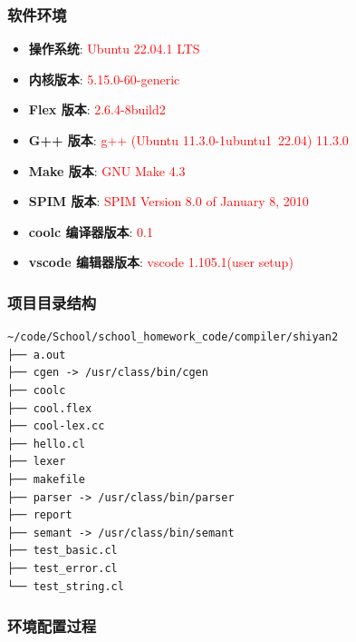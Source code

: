\documentclass[twocolumn]{article}
\begin{document}
\subsubsection{软件环境}
\begin{itemize}
    \item \textbf{操作系统}: \textcolor{red}{Ubuntu 22.04.1 LTS}
    \item \textbf{内核版本}: \textcolor{red}{5.15.0-60-generic}
    \item \textbf{Flex 版本}: \textcolor{red}{2.6.4-8build2}
    \item \textbf{G++ 版本}: \textcolor{red}{g++ (Ubuntu 11.3.0-1ubuntu1~22.04) 11.3.0}
    \item \textbf{Make 版本}: \textcolor{red}{GNU Make 4.3}
    \item \textbf{SPIM 版本}: \textcolor{red}{SPIM Version 8.0 of January 8, 2010}
    \item \textbf{coolc 编译器版本}: \textcolor{red}{0.1}
    \item \textbf{vscode 编辑器版本}: \textcolor{red}{vscode 1.105.1(user setup)}
\end{itemize}

\subsubsection{项目目录结构}
\begin{verbatim}
~/code/School/school_homework_code/compiler/shiyan2
├── a.out
├── cgen -> /usr/class/bin/cgen
├── coolc
├── cool.flex
├── cool-lex.cc
├── hello.cl
├── lexer
├── makefile
├── parser -> /usr/class/bin/parser
├── report
├── semant -> /usr/class/bin/semant
├── test_basic.cl
├── test_error.cl
└── test_string.cl            
\end{verbatim}

\subsubsection{环境配置过程}
\end{document}
